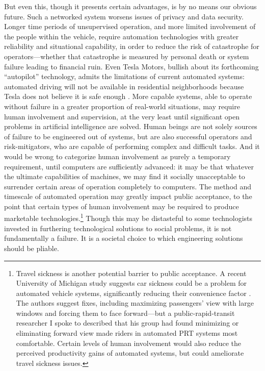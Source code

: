 But even this, though it presents certain advantages, is by no means
our obvious future. Such a networked system worsens issues of privacy
and data security. Longer time periods of unsupervised operation, and
more limited involvement of the people within the vehicle, require
automation technologies with greater reliability and situational
capability, in order to reduce the risk of catastrophe for
operators---whether that catastrophe is measured by personal death or
system failure leading to financial ruin. Even Tesla Motors, bullish
about its forthcoming ``autopilot'' technology, admits the limitations
of current automated systems: automated driving will not be available
in residential neighborhoods because Tesla does not believe it is safe
enough \cite{slashgearDaviesT}.
More capable systems, able to operate without failure in a greater
proportion of real-world situations, may require human involvement and
supervision, at the very least until significant open problems in
artificial intelligence are solved. Human beings are not solely
sources of failure to be engineered out of systems, but are also
successful operators and risk-mitigators, who are capable of
performing complex and difficult tasks. And it would be wrong to
categorize human involvement as purely a temporary requirement, until
computers are sufficiently advanced:  it
may be that whatever the ultimate capabilities of machines, we may
find it socially unacceptable to surrender certain areas of operation
completely to computers. The method and timescale of automated
operation may greatly impact 
public acceptance, to the point that certain types of human
involvement may be required to produce marketable
technologies.\footnote{Travel sickness is another potential barrier to
  public acceptance. A
  recent University of Michigan study suggests car sickness could be a
  problem for automated vehicle systems,  significantly reducing their
  convenience factor
  \cite{SivakSchoettleSick}. The authors suggest fixes, including
  maximizing passengers' view with large windows and forcing them to
  face forward---but a
  public-rapid-transit researcher I spoke to described that his group
  had found minimizing or eliminating forward view made riders in
  automated PRT systems
  most comfortable.
  Certain levels of human involvement would also reduce the perceived productivity
  gains of automated systems, but could ameliorate travel sickness
  issues.} Though
this may be distasteful to some technologists invested in furthering
technological solutions to social problems, it is not fundamentally
a failure. It is a societal choice to which engineering solutions
should be pliable.

